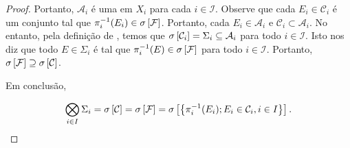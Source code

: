\begin{proof}
    Portanto, $\mathcal{A}_i$ é uma \sigmaAlg em $X_i$ para cada $i\in\mathcal{I}$. Observe que cada $E_i\in\mathcal{C}_i$ é um conjunto tal que $\pi_i^{-1}(E_i)\in\sigma \left[\mathcal{F}\right]$. Portanto, cada $E_i\in\mathcal{A}_i$ e $\mathcal{C}_i\subset \mathcal{A}_i$. No entanto, pela definição de , temos que $\sigma \left[\mathcal{C}_i\right]=\Sigma_i\subseteq\mathcal{A}_i$ para todo $i\in\mathcal{I}$. Isto nos diz que todo $E\in\Sigma_i$ é tal que $\pi_{i}^{-1}(E)\in\sigma \left[\mathcal{F}\right]$ para todo $i\in\mathcal{I}$. Portanto, $\sigma \left[\mathcal{F}\right]\supseteq \sigma \left[\mathcal{C}\right]$.

    Em conclusão,

    \begin{equation*}
        \bigotimes_{i\in I} \Sigma_i=\sigma \left[\mathcal{C}\right]=\sigma \left[\mathcal{F}\right]=\sigma \left[\left\{\pi_i^{-1}(E_i); E_i\in \mathcal{C}_i, i\in I\right\}\right].
    \end{equation*}

\end{proof}